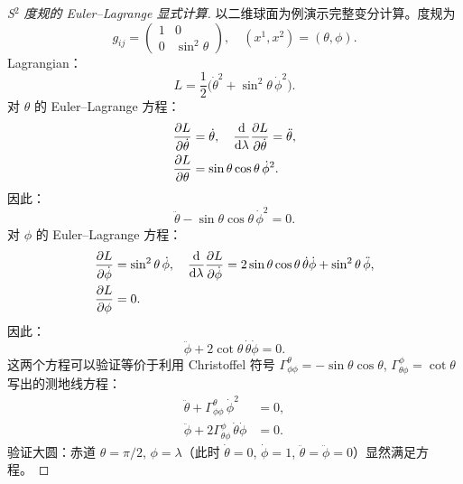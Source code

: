 \begin{proof}[S$^2$ 度规的 Euler--Lagrange 显式计算]
以二维球面为例演示完整变分计算。度规为
\begin{equation}
    g_{ij} = \begin{pmatrix} 1 & 0 \\ 0 & \sin^2\theta \end{pmatrix}, \quad (x^1, x^2) = (\theta, \phi).
\end{equation}
Lagrangian：
\begin{equation}
    L = \frac{1}{2}\bigl(\dot\theta^2 + \sin^2\theta \, \dot\phi^2\bigr).
\end{equation}
对 $\theta$ 的 Euler--Lagrange 方程：
\begin{align}
    \frac{\partial L}{\partial \dot\theta} &= \dot\theta, \quad
    \frac{\dd}{\dd\lambda}\frac{\partial L}{\partial \dot\theta} = \ddot\theta, \\
    \frac{\partial L}{\partial \theta} &= \sin\theta\cos\theta \, \dot\phi^2.
\end{align}
因此：
\begin{equation}
    \ddot\theta - \sin\theta\cos\theta \, \dot\phi^2 = 0.
\end{equation}
对 $\phi$ 的 Euler--Lagrange 方程：
\begin{align}
    \frac{\partial L}{\partial \dot\phi} &= \sin^2\theta \, \dot\phi, \quad
    \frac{\dd}{\dd\lambda}\frac{\partial L}{\partial \dot\phi} = 2\sin\theta\cos\theta \, \dot\theta \dot\phi + \sin^2\theta \, \ddot\phi, \\
    \frac{\partial L}{\partial \phi} &= 0.
\end{align}
因此：
\begin{equation}
    \ddot\phi + 2\cot\theta \, \dot\theta \dot\phi = 0.
\end{equation}
这两个方程可以验证等价于利用 Christoffel 符号 $\Gamma^\theta_{\phi\phi} = -\sin\theta\cos\theta$, $\Gamma^\phi_{\theta\phi} = \cot\theta$ 写出的测地线方程：
\begin{align}
    \ddot\theta + \Gamma^\theta_{\phi\phi} \, \dot\phi^2 &= 0, \\
    \ddot\phi + 2\Gamma^\phi_{\theta\phi} \, \dot\theta \dot\phi &= 0.
\end{align}
验证大圆：赤道 $\theta = \pi/2$, $\phi = \lambda$（此时 $\dot\theta = 0$, $\dot\phi = 1$, $\ddot\theta = \ddot\phi = 0$）显然满足方程。
\end{proof}

